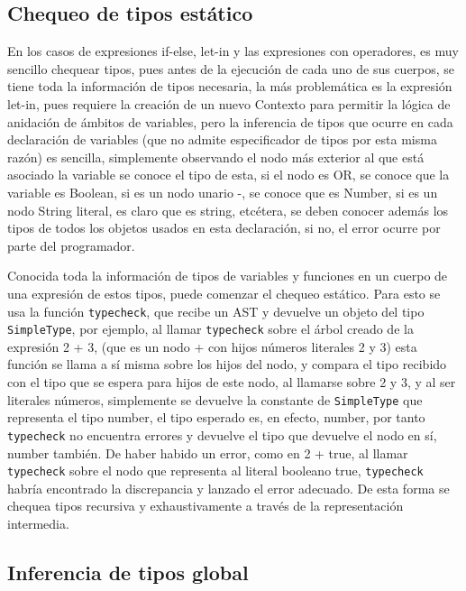 \documentclass{article}
\begin{document}
\subsection{Chequeo de tipos estático}

En los casos de expresiones if-else, let-in y las expresiones con operadores, es muy sencillo chequear tipos, pues antes de la ejecución de cada uno de sus cuerpos, se tiene toda la información de tipos necesaria, la más problemática es la expresión let-in, pues requiere la creación de un nuevo Contexto para permitir la lógica de anidación de ámbitos de variables, pero la inferencia de tipos que ocurre en cada declaración de variables (que no admite especificador de tipos por esta misma razón) es sencilla, simplemente observando el nodo más exterior al que está asociado la variable se conoce el tipo de esta, si el nodo es OR, se conoce que la variable es Boolean, si es un nodo unario -, se conoce que es Number, si es un nodo String literal, es claro que es string, etcétera, se deben conocer además los tipos de todos los objetos usados en esta declaración, si no, el error ocurre por parte del programador.

Conocida toda la información de tipos de variables y funciones en un cuerpo de una expresión de estos tipos, puede comenzar el chequeo estático. Para esto se usa la función \texttt{typecheck}, que recibe un AST y devuelve un objeto del tipo \texttt{SimpleType}, por ejemplo, al llamar \texttt{typecheck} sobre el árbol creado de la expresión 2 + 3, (que es un nodo + con hijos números literales 2 y 3) esta función se llama a sí misma sobre los hijos del nodo, y compara el tipo recibido con el tipo que se espera para hijos de este nodo, al llamarse sobre 2 y 3, y al ser literales números, simplemente se devuelve la constante de \texttt{SimpleType} que representa el tipo number, el tipo esperado es, en efecto, number, por tanto \texttt{typecheck} no encuentra errores y devuelve el tipo que devuelve el nodo en sí, number también. De haber habido un error, como en 2 + true, al llamar \texttt{typecheck} sobre el nodo que representa al literal booleano true, \texttt{typecheck} habría encontrado la discrepancia y lanzado el error adecuado. De esta forma se chequea tipos recursiva y exhaustivamente a través de la representación intermedia.

\subsection{Inferencia de tipos global}
\end{document}
